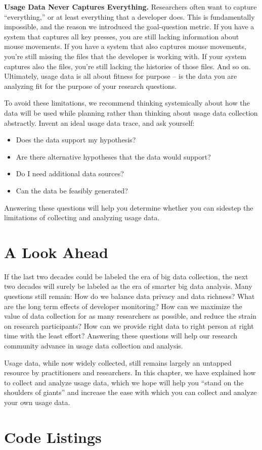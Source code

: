 \documentclass{book}
\begin{document}
\textbf{Usage Data Never Captures Everything.}
Researchers often want to capture ``everything,'' or at least
everything that a developer does.
This is fundamentally impossible, and the reason we introduced the
goal-question metric.
If you have a system that captures all key presses, you are still
lacking information about mouse movements.
If you have a system that also captures mouse movements, you're still
missing the files that the developer is working with.
If your system captures also the files, you're still lacking the
histories of those files.
And so on.
Ultimately, usage data is all about fitness for purpose -- is the data
you are analyzing fit for the purpose of your research questions.

To avoid these limitations, we recommend thinking systemically about how the data will be used while planning rather than thinking about usage data collection abstractly.
Invent an ideal usage data trace, and ask yourself:

\begin{itemize}[noitemsep]
  \item Does the data support my hypothesis?
  \item Are there alternative hypotheses that the data would support?
  \item Do I need additional data sources?
  \item Can the data be feasibly generated?
\end{itemize}

\noindent
Answering these questions will help you determine whether you can sidestep
the limitations of collecting and analyzing usage data.

\section{A Look Ahead}

If the last two decades could be labeled the era
of big data collection,
the next two decades will surely be labeled as the
era of smarter big data analysis.
Many questions still remain:
How do we balance data privacy and data richness?
What are the long term effects of developer monitoring?
How can we maximize the value of data collection
for as many researchers as possible, and reduce the
strain on research participants? How can we provide right data to right person at right time with the least effort?
Answering these questions will help our research
community advance in usage data collection and analysis.

Usage data, while now widely collected, still remains largely
an untapped resource by practitioners and researchers.
In this chapter, we have explained how to collect and
analyze usage data, which we hope will help you ``stand
on the shoulders of giants'' and increase the ease
with which you can collect and analyze your own usage data.


\section{Code Listings}



 
\end{document}
